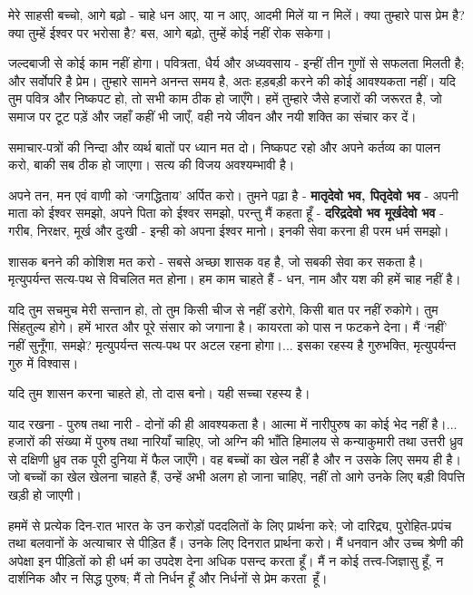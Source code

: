\vskip 2.6pt

मेरे साहसी बच्चो, आगे बढ़ो - चाहे धन आए, या न आए, आदमी मिलें या न मिलें। क्या तुम्हारे पास प्रेम है? क्या तुम्हें ईश्वर पर भरोसा है? बस, आगे बढ़ो, तुम्हें कोई नहीं रोक सकेगा। 

\vskip 2.6pt

जल्दबाजी से कोई काम नहीं होगा। पवित्रता, धैर्य और अध्यवसाय - इन्हीं तीन गुणों से सफलता मिलती है; और सर्वोपरि है प्रेम। तुम्हारे सामने अनन्त समय है, अतः हड़बड़ी करने की कोई आवश्यकता नहीं। यदि तुम पवित्र और निष्कपट हो, तो सभी काम ठीक हो जाएँगे। हमें तुम्हारे जैसे हजारों की जरूरत है, जो समाज पर टूट पड़ें और जहाँ कहीं भी जाएँ, वही नये जीवन और नयी शक्ति का संचार कर दें। 

समाचार-पत्रों की निन्दा और व्यर्थ बातों पर ध्यान मत दो। निष्कपट रहो और अपने कर्तव्य का पालन करो, बाकी सब ठीक हो जाएगा। सत्य की विजय अवश्यम्भावी है। 

अपने तन, मन एवं वाणी को ‘जगद्धिताय’ अर्पित करो। तुमने पढ़ा है - \textbf{मातृदेवो भव, पितृदेवो भव } - अपनी माता को ईश्वर समझो, अपने पिता को ईश्वर समझो, परन्तु मैं कहता हूँ - \textbf{दरिद्रदेवो भव मूर्खदेवो भव } - गरीब, निरक्षर, मूर्ख और दुःखी - इन्ही को अपना ईश्वर मानो। इनकी सेवा करना ही परम धर्म समझो। 

शासक बनने की कोशिश मत करो - सबसे अच्छा शासक वह है, जो सबकी सेवा कर सकता है। मृत्युपर्यन्त सत्य-पथ से विचलित मत होना। हम काम चाहते हैं - धन, नाम और यश की हमें चाह नहीं है। 

यदि तुम सचमुच मेरी सन्तान हो, तो तुम किसी चीज से नहीं डरोगे, किसी बात पर नहीं रुकोगे। तुम सिंहतुल्य होगे। हमें भारत और पूरे संसार को जगाना है। कायरता को पास न फटकने देना। मैं ‘नहीं’ नहीं सुनूँगा, समझे? मृत्युपर्यन्त सत्य-पथ पर अटल रहना होगा।... इसका रहस्य है गुरुभक्ति, मृत्युपर्यन्त गुरु में विश्वास। 

यदि तुम शासन करना चाहते हो, तो दास बनो। यही सच्चा रहस्य है। 

याद रखना - पुरुष तथा नारी - दोनों की ही आवश्यकता है। आत्मा में नारीपुरुष का कोई भेद नहीं है।... हजारों की संख्या में पुरुष तथा नारियाँ चाहिए, जो अग्नि की भाँति हिमालय से कन्याकुमारी तथा उत्तरी ध्रुव से दक्षिणी ध्रुव तक पूरी दुनिया में फैल जाएँगे। वह बच्चों का खेल नहीं है और न उसके लिए समय ही है। जो बच्चों का खेल खेलना चाहते हैं, उन्हें अभी अलग हो जाना चाहिए, नहीं तो आगे उनके लिए बड़ी विपत्ति खड़ी हो जाएगी। 

हममें से प्रत्येक दिन-रात भारत के उन करोड़ों पददलितों के लिए प्रार्थना करे; जो दारिद्र्य, पुरोहित-प्रपंच तथा बलवानों के अत्याचार से पीड़ित हैं। उनके लिए दिनरात प्रार्थना करो। मैं धनवान और उच्च श्रेणी की अपेक्षा इन पीड़ितों को ही धर्म का उपदेश देना अधिक पसन्द करता हूँ। मैं न कोई तत्त्व-जिज्ञासु हूँ, न दार्शनिक और न सिद्ध पुरुष; मैं तो निर्धन हूँ और निर्धनों से प्रेम करता~हूँ। 

